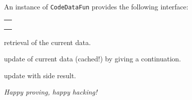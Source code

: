 \begin{isabellebody}
\begin{isamarkuptext}
\begin{description}
  \end{description}

  \noindent An instance of \verb|CodeDataFun| provides the following
  interface:

  \medskip
  \begin{tabular}{l}
  \isa{get{\isacharcolon}\ theory\ {\isasymrightarrow}\ T} \\
  \isa{change{\isacharcolon}\ theory\ {\isasymrightarrow}\ {\isacharparenleft}T\ {\isasymrightarrow}\ T{\isacharparenright}\ {\isasymrightarrow}\ T} \\
  \isa{change{\isacharunderscore}yield{\isacharcolon}\ theory\ {\isasymrightarrow}\ {\isacharparenleft}T\ {\isasymrightarrow}\ {\isacharprime}a\ {\isacharasterisk}\ T{\isacharparenright}\ {\isasymrightarrow}\ {\isacharprime}a\ {\isacharasterisk}\ T}
  \end{tabular}

  \begin{description}

  \item {} retrieval of the current data.

  \item {} update of current data (cached!)
    by giving a continuation.

  \item {} update with side result.

  \end{description}%
\end{isamarkuptext}%
\isamarkuptrue%
%
\begin{isamarkuptext}%
\bigskip

  \emph{Happy proving, happy hacking!}%
\end{isamarkuptext}%
\isamarkuptrue%
%
\isadelimtheory
%
\endisadelimtheory
%
\isatagtheory
{}\isamarkupfalse%
%
\endisatagtheory
{\isafoldtheory}%
%
\isadelimtheory
%
\endisadelimtheory
\isanewline
\end{isabellebody}%
